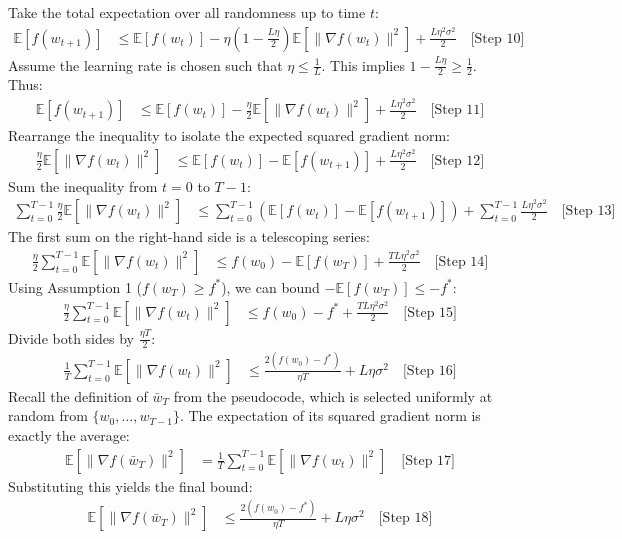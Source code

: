 \documentclass[11pt]{article}
\begin{document}
Take the total expectation over all randomness up to time $t$:
\begin{align}
    \mathbb{E}[f(w_{t+1})] &\leq \mathbb{E}[f(w_t)] - \eta \left( 1 - \frac{L\eta}{2} \right) \mathbb{E}[\|\nabla f(w_t)\|^2] + \frac{L\eta^2\sigma^2}{2} \quad \text{[Step 10]}
\end{align}
Assume the learning rate is chosen such that $\eta \leq \frac{1}{L}$. This implies $1 - \frac{L\eta}{2} \geq \frac{1}{2}$. Thus:
\begin{align}
    \mathbb{E}[f(w_{t+1})] &\leq \mathbb{E}[f(w_t)] - \frac{\eta}{2} \mathbb{E}[\|\nabla f(w_t)\|^2] + \frac{L\eta^2\sigma^2}{2} \quad \text{[Step 11]}
\end{align}
Rearrange the inequality to isolate the expected squared gradient norm:
\begin{align}
    \frac{\eta}{2} \mathbb{E}[\|\nabla f(w_t)\|^2] &\leq \mathbb{E}[f(w_t)] - \mathbb{E}[f(w_{t+1})] + \frac{L\eta^2\sigma^2}{2} \quad \text{[Step 12]}
\end{align}
Sum the inequality from $t = 0$ to $T - 1$:
\begin{align}
    \sum_{t=0}^{T-1} \frac{\eta}{2} \mathbb{E}[\|\nabla f(w_t)\|^2] &\leq \sum_{t=0}^{T-1} \left( \mathbb{E}[f(w_t)] - \mathbb{E}[f(w_{t+1})] \right) + \sum_{t=0}^{T-1} \frac{L\eta^2\sigma^2}{2} \quad \text{[Step 13]}
\end{align}
The first sum on the right-hand side is a telescoping series:
\begin{align}
    \frac{\eta}{2} \sum_{t=0}^{T-1} \mathbb{E}[\|\nabla f(w_t)\|^2] &\leq f(w_0) - \mathbb{E}[f(w_T)] + \frac{TL\eta^2\sigma^2}{2} \quad \text{[Step 14]}
\end{align}
Using Assumption 1 ($f(w_T) \geq f^*$), we can bound $-\mathbb{E}[f(w_T)] \leq -f^*$:
\begin{align}
    \frac{\eta}{2} \sum_{t=0}^{T-1} \mathbb{E}[\|\nabla f(w_t)\|^2] &\leq f(w_0) - f^* + \frac{TL\eta^2\sigma^2}{2} \quad \text{[Step 15]}
\end{align}
Divide both sides by $\frac{\eta T}{2}$:
\begin{align}
    \frac{1}{T} \sum_{t=0}^{T-1} \mathbb{E}[\|\nabla f(w_t)\|^2] &\leq \frac{2(f(w_0) - f^*)}{\eta T} + L\eta\sigma^2 \quad \text{[Step 16]}
\end{align}
Recall the definition of $\bar{w}_T$ from the pseudocode, which is selected uniformly at random from $\{w_0, \dots, w_{T-1}\}$. The expectation of its squared gradient norm is exactly the average:
\begin{align}
    \mathbb{E}[\|\nabla f(\bar{w}_T)\|^2] &= \frac{1}{T} \sum_{t=0}^{T-1} \mathbb{E}[\|\nabla f(w_t)\|^2] \quad \text{[Step 17]}
\end{align}
Substituting this yields the final bound:
\begin{align}
    \mathbb{E}[\|\nabla f(\bar{w}_T)\|^2] &\leq \frac{2(f(w_0) - f^*)}{\eta T} + L\eta\sigma^2 \quad \text{[Step 18]}
\end{align}
\end{document}
